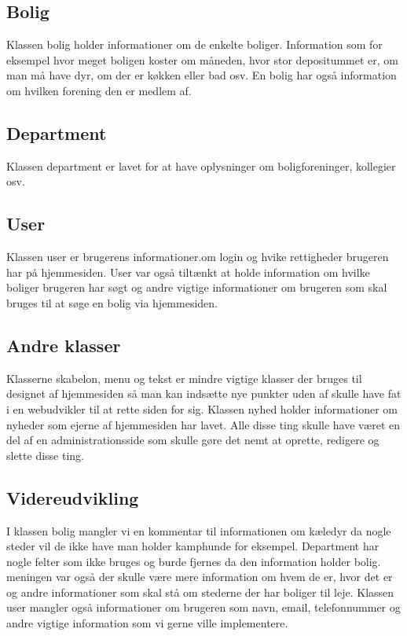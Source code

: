 \documentclass[12pt, a4paper]{report}
\begin{document}
\subsection{Bolig}
Klassen bolig holder informationer om de enkelte boliger. Information som for eksempel hvor meget boligen koster om måneden, hvor stor depositummet er, om man må have dyr, om der er køkken eller bad osv. En bolig har også information om hvilken forening den er medlem af.

\subsection{Department}
Klassen department er lavet for at have oplysninger om boligforeninger, kollegier osv.

\subsection{User}
Klassen user er brugerens informationer.om login og hvike rettigheder brugeren har på hjemmesiden. User var også tiltænkt at holde information om hvilke boliger brugeren har søgt og andre vigtige informationer om brugeren som skal bruges til at søge en bolig via hjemmesiden.

\subsection{Andre klasser}
Klasserne skabelon, menu og tekst er mindre vigtige klasser der bruges til designet af hjemmesiden så man kan indsætte nye punkter uden af skulle have fat i en webudvikler til at rette siden for sig.
Klassen nyhed holder informationer om nyheder som ejerne af hjemmesiden har lavet.
Alle disse ting skulle have været en del af en administrationsside som skulle gøre det nemt at oprette, redigere og slette disse ting.

\subsection{Videreudvikling}
I klassen bolig mangler vi en kommentar til informationen om kæledyr da nogle steder vil de ikke have man holder kamphunde for eksempel.
Department har nogle felter som ikke bruges og burde fjernes da den information holder bolig. meningen var også der skulle være mere information om hvem de er, hvor det er og andre informationer som skal stå om stederne der har boliger til leje.
Klassen user mangler også informationer om brugeren som navn, email, telefonnummer og andre vigtige information som vi gerne ville implementere.
\end{document}
